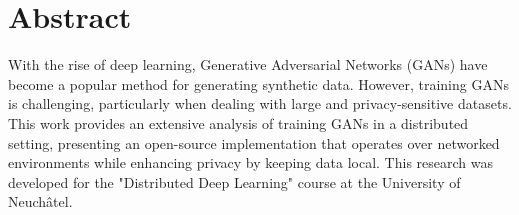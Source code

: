\chapter{Abstract}
With the rise of deep learning, Generative Adversarial Networks (GANs) have become a popular method for generating synthetic data. However, training GANs is challenging, particularly when dealing with large and privacy-sensitive datasets. This work provides an extensive analysis of training GANs in a distributed setting, presenting an open-source implementation that operates over networked environments while enhancing privacy by keeping data local. This research was developed for the "Distributed Deep Learning" course at the University of Neuchâtel.